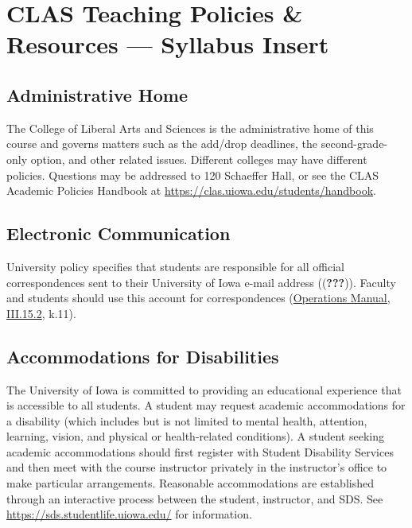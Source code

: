 \documentclass[11pt,]{article}
\theoremstyle{definition}
\theoremstyle{definition}
\theoremstyle{remark}
\begin{document}
\clearpage

\section{CLAS Teaching Policies \& Resources --- Syllabus
Insert}\label{clas-teaching-policies-resources-syllabus-insert}

\subsection{Administrative Home}\label{administrative-home}

The College of Liberal Arts and Sciences is the administrative home of
this course and governs matters such as the add/drop deadlines, the
second-grade-only option, and other related issues. Different colleges
may have different policies. Questions may be addressed to 120 Schaeffer
Hall, or see the CLAS Academic Policies Handbook at
\url{https://clas.uiowa.edu/students/handbook}.

\subsection{Electronic Communication}\label{electronic-communication}

University policy specifies that students are responsible for all
official correspondences sent to their University of Iowa e-mail address
(({\textbf{???}})). Faculty and students should use this account for
correspondences
(\href{https://opsmanual.uiowa.edu/human-resources/professional-ethics-and-academic-responsibility\#15.2}{Operations
Manual, III.15.2}, k.11).

\subsection{Accommodations for
Disabilities}\label{accommodations-for-disabilities}

The University of Iowa is committed to providing an educational
experience that is accessible to all students. A student may request
academic accommodations for a disability (which includes but is not
limited to mental health, attention, learning, vision, and physical or
health-related conditions). A student seeking academic accommodations
should first register with Student Disability Services and then meet
with the course instructor privately in the instructor's office to make
particular arrangements. Reasonable accommodations are established
through an interactive process between the student, instructor, and SDS.
See \url{https://sds.studentlife.uiowa.edu/} for information.
\end{document}
